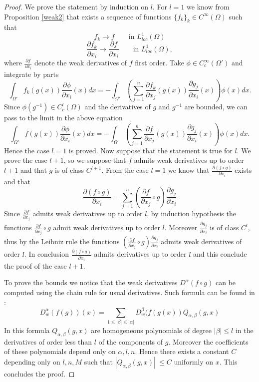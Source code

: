 \documentclass[12pt]{article}
\theoremstyle{definition}
\begin{document}
\begin{proof}
We prove the statement by induction on $l$. For $l=1$ we know from Proposition \ref{weak2} that exists a sequence of functions $\{f_k\}_k  \in C^\infty(\Omega)$ such that
\[ f_k \rightarrow f \qquad \text{in } L^1_{loc}(\Omega) \]
\[ \frac{\partial f_k }{\partial x_i}\rightarrow \frac{\partial f }{\partial x_i} \qquad \text{in } L^1_{loc}(\Omega),\]
where $\frac{\partial f }{\partial x_i}$ denote the weak derivatives of $f$ first order. Take $\phi \in C^\infty_c(\Omega')$ and integrate by parts
\[\int_{\Omega'} f_k(g(x))\frac{\partial \phi }{\partial x_i}(x)dx = - \int_{\Omega'} \left(\sum_{j=1}^n \frac{\partial f_k }{\partial x_j}(g(x))\frac{\partial g_j }{\partial x_i}(x)\right)\phi(x)dx.\]
Since $\phi(g^{-1}) \in C^l_c(\Omega)$ and the derivatives of $g$ and $g^{-1}$ are bounded, we can pass to the limit in the above equation
\[\int_{\Omega'} f(g(x))\frac{\partial \phi }{\partial x_i}(x)dx = - \int_{\Omega'} \left(\sum_{j=1}^n \frac{\partial f }{\partial x_j}(g(x))\frac{\partial g_j }{\partial x_i}(x)\right)\phi(x)dx.\]
Hence the case $l=1$ is proved. Now suppose that the statement is true for $l$. We prove the case $l+1$, so we suppose that $f$ admits weak derivatives up to order $l+1$ and that $g$ is of class $C^{l+1}$. From the case $l=1$ we know that $\frac{\partial (f \circ g) }{\partial x_i}$ exists and that
\[ \frac{\partial (f \circ g) }{\partial x_i}= \sum_{j=1}^n (\frac{\partial f }{\partial x_j} \circ g)\frac{\partial g_j }{\partial x_i}\] 
Since $\frac{\partial f }{\partial x_j}$ admits weak derivatives up to order $l$, by induction hypothesis the functions $\frac{\partial f }{\partial x_j} \circ g$ admit weak derivatives up to order $l$. Moreover $\frac{\partial g_j }{\partial x_i}$ is of class $C^l$, thus by the Leibniz rule the functions $(\frac{\partial f }{\partial x_j} \circ g)\frac{\partial g_j }{\partial x_i}$ admits weak derivatives of order $l$. In conclusion $\frac{\partial (f \circ g) }{\partial x_i}$ admits derivatives up to order $l$ and this conclude the proof of the case $l+1$. 

To prove the bounds we notice that the weak derivatives $D^\alpha (f \circ g)$ can be computed using the chain rule for usual derivatives. Such formula can be found in \cite[formula B] {fraenkel}:
\[ D^{\alpha}_w(f(g))(x) = \sum_{1\le |\beta|\le|\alpha| }D^{\beta}_w(f(g(x)) Q_{\alpha,\beta}(g,x)\]
In this formula $Q_{\alpha,\beta}(g,x)$ are homogeneous polynomials of degree $|\beta|\le l$ in the derivatives of order less than $l$ of the components of $g$. Moreover the coefficients of these polynomials depend only on $\alpha,l,n$. Hence there exists a constant $C$ depending only on $l,n,M$ such that $|Q_{\alpha,\beta}(g,x)|\ \le C$ uniformly on $x$. This concludes the proof.
\end{proof}
\end{document}
